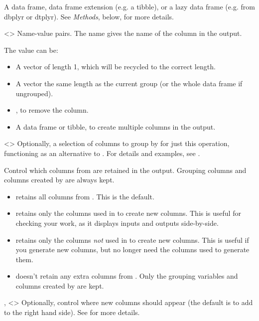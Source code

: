 \documentclass[a4paper]{book}
\begin{document}
\begin{Arguments}
\begin{ldescription}
\item[\code{.data}] A data frame, data frame extension (e.g. a tibble), or a
lazy data frame (e.g. from dbplyr or dtplyr). See \emph{Methods}, below, for
more details.

\item[\code{...}] <> Name-value pairs.
The name gives the name of the column in the output.

The value can be:
\begin{itemize}

\item{} A vector of length 1, which will be recycled to the correct length.
\item{} A vector the same length as the current group (or the whole data frame
if ungrouped).
\item{} , to remove the column.
\item{} A data frame or tibble, to create multiple columns in the output.

\end{itemize}


\item[\code{.by}] \strong{[Experimental]}

<> Optionally, a selection of columns to
group by for just this operation, functioning as an alternative to . For
details and examples, see .

\item[\code{.keep}] Control which columns from  are retained in the output. Grouping
columns and columns created by  are always kept.
\begin{itemize}

\item{}  retains all columns from . This is the default.
\item{}  retains only the columns used in  to create new
columns. This is useful for checking your work, as it displays inputs
and outputs side-by-side.
\item{}  retains only the columns \emph{not} used in  to create new
columns. This is useful if you generate new columns, but no longer need
the columns used to generate them.
\item{}  doesn't retain any extra columns from . Only the grouping
variables and columns created by  are kept.

\end{itemize}


\item[\code{.before}, \code{.after}] <> Optionally, control where new columns
should appear (the default is to add to the right hand side). See
 for more details.
\end{ldescription}
\end{Arguments}
\end{document}
